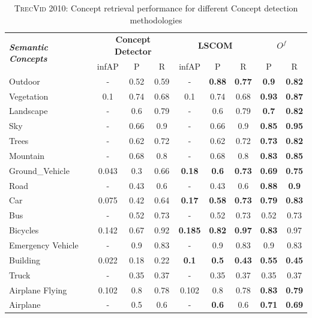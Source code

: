 		\begin{table}[h]
			\centering
			\caption{\textsc{TrecVid 2010}: Concept retrieval performance for different Concept detection methodologies}
			\label{tab3}
			\begin{tabular}{l||ccc|ccc|cc}\hline


				\multirow{2}{*}{\textit{\textbf{Semantic Concepts}}} & 
				\multicolumn{3}{c}{\textbf{Concept Detector}} & 
				\multicolumn{3}{c}{\textbf{LSCOM}}&
				\multicolumn{2}{c}{\textbf{$O^{f}$}}\\ 

				& infAP & P & R & infAP & P & R & P & R\\
				\hline
				\hline
	
Outdoor	&	-&	0.52&	0.59&	-&	\textbf{0.88}	& \textbf{0.77} & \textbf{0.9} & \textbf{0.82}\\
Vegetation	& 0.1 	& 0.74& 0.68& 0.1& 0.74 & 0.68 & \textbf{0.93} & \textbf{0.87} \\
Landscape& -& 0.6& 0.79& -& 0.6 & 0.79& \textbf{0.7} & \textbf{0.82}\\
Sky& -& 0.66& 0.9& -& 0.66& 0.9 & \textbf{0.85} & \textbf{0.95} \\
Trees& -& 0.62& 0.72 & - & 0.62 & 0.72 & \textbf{0.73} & \textbf{0.82}\\
Mountain& -& 0.68 & 0.8 & -  & 0.68 & 0.8 & \textbf{0.83} & \textbf{0.85} \\
Ground\_Vehicle& 0.043  & 0.3& 0.66& \textbf{0.18} & \textbf{0.6} & \textbf{0.73} & \textbf{0.69} & \textbf{0.75}\\
Road& -& 0.43& 0.6 & -& 0.43& 0.6 & \textbf{0.88} & \textbf{0.9} \\
Car  & 0.075 & 0.42 & 0.64& \textbf{0.17} & \textbf{0.58} & \textbf{0.73} & \textbf{0.79} & \textbf{0.83}\\
Bus& -& 0.52& 0.73& - & 0.52& 0.73 & 0.52 & 0.73\\
Bicycles& 0.142& 0.67& 0.92& \textbf{0.185}& \textbf{0.82}& \textbf{0.97} & \textbf{0.83} & 0.97\\
Emergency Vehicle& -& 0.9& 0.83& - & 0.9& 0.83 & 0.9& 0.83\\
Building& 0.022& 0.18& 0.22& \textbf{0.1}& \textbf{0.5}& \textbf{0.43} & \textbf{0.55} & \textbf{0.45} \\
Truck & -& 0.35& 0.37& -& 0.35& 0.37 & 0.35 & 0.37\\
Airplane Flying & 0.102& 0.8 & 0.78& 0.102& 0.8& 0.78 & \textbf{0.83} & \textbf{0.79}  \\
Airplane  & -& 0.5& 0.6& -& \textbf{0.6}& 0.6  & \textbf{0.71} & \textbf{0.69}\\
\hline
\end{tabular}
\end{table}

